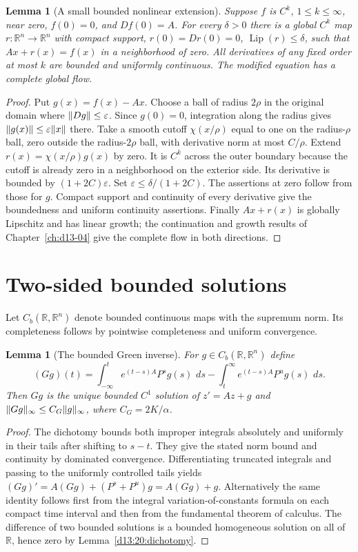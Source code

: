 \documentclass[11pt,oneside]{book}
\newtheorem{lemma}[theorem]{Lemma}
\theoremstyle{definition}
\theoremstyle{remark}\newtheorem{remark}[theorem]{Remark}
\newcommand{\R}{\mathbb R}\newcommand{\C}{\mathbb C}
\newcommand{\dd}{\,d}\newcommand{\id}{\operatorname{id}}
\DeclareMathOperator{\Lip}{Lip}\DeclareMathOperator{\Span}{span}
\begin{document}
\begin{lemma}[A small bounded nonlinear extension]\label{d13:20:cutoff}
Suppose $f$ is $C^k$, $1\leq k\leq\infty$, near zero, $f(0)=0$, and
$Df(0)=A$. For every $\delta>0$ there is a global $C^k$ map $r:\R^n\to\R^n$
with compact support, $r(0)=Dr(0)=0$, $\Lip(r)\leq\delta$, such that
$Ax+r(x)=f(x)$ in a neighborhood of zero. All derivatives of any fixed
order at most $k$ are bounded and uniformly continuous. The modified
equation has a complete global flow.
\end{lemma}
\begin{proof}
Put $g(x)=f(x)-Ax$. Choose a ball of radius $2\rho$ in the original domain
where $\lVert Dg\rVert\leq\varepsilon$. Since $g(0)=0$, integration along the
radius gives $\lVert g(x)\rVert\leq\varepsilon\lVert x\rVert$ there. Take a smooth cutoff
$\chi(x/\rho)$ equal to one on the radius-$\rho$ ball, zero outside the
radius-$2\rho$ ball, with derivative norm at most $C/\rho$. Extend
$r(x)=\chi(x/\rho)g(x)$ by zero. It is $C^k$ across the outer boundary
because the cutoff is already zero in a neighborhood on the exterior side.
Its derivative is bounded by $(1+2C)\varepsilon$. Set
$\varepsilon\leq\delta/(1+2C)$. The assertions at zero follow from those
for $g$. Compact support and continuity of every derivative give the
boundedness and uniform continuity assertions. Finally $Ax+r(x)$ is
globally Lipschitz and has linear growth; the continuation and growth
results of Chapter~\ref{ch:d13-04} give the complete flow in both directions.
\end{proof}

\section{Two-sided bounded solutions}
Let $C_b(\R,\R^n)$ denote bounded continuous maps with the supremum norm.
Its completeness follows by pointwise completeness and uniform convergence.

\begin{lemma}[The bounded Green inverse]\label{d13:20:green}
For $g\in C_b(\R,\R^n)$ define
\[
 (Gg)(t)=\int_{-\infty}^t e^{(t-s)A}P^s g(s)\,\dd s
          -\int_t^\infty e^{(t-s)A}P^u g(s)\,\dd s.
\]
Then $Gg$ is the unique bounded $C^1$ solution of $z'=Az+g$ and
$\lVert Gg\rVert_\infty\leq C_G\lVert g\rVert_\infty$, where $C_G=2K/\alpha$.
\end{lemma}
\begin{proof}
The dichotomy bounds both improper integrals absolutely and uniformly in
their tails after shifting to $s-t$. They give the stated norm bound and
continuity by dominated convergence. Differentiating truncated integrals
and passing to the uniformly controlled tails yields
$(Gg)'=A(Gg)+(P^s+P^u)g=A(Gg)+g$. Alternatively the same identity follows
first from the integral variation-of-constants formula on each compact
time interval and then from the fundamental theorem of calculus.
The difference of two bounded solutions is a bounded homogeneous solution
on all of $\R$, hence zero by Lemma~\ref{d13:20:dichotomy}.
\end{proof}
\end{document}
